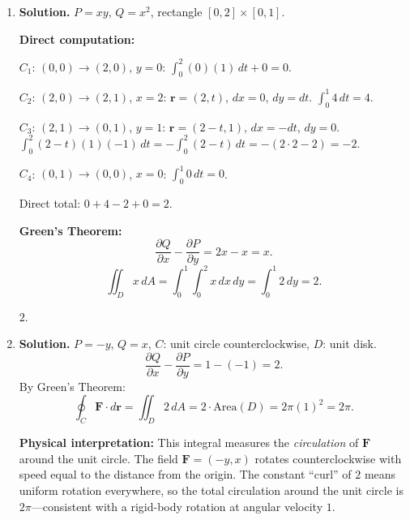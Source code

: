 \begin{enumerate}
\textbf{Conceptual explanation:} The line integral measures the total ``circulation'' of the vector field $(P,Q)$ around the boundary. Green's Theorem says this equals the sum of all the ``local rotation'' ($\partial Q/\partial x - \partial P/\partial y$) accumulated over the interior region. Intuitively, if we partition $D$ into infinitesimally small rectangles and sum the circulation around each, all interior edge contributions cancel (shared edges are traversed in opposite directions by adjacent rectangles), leaving only the outer boundary $C$. The double integral simply adds up the microscopic rotation at every interior point.

\item \textbf{Solution.}
$P = xy$, $Q = x^2$, rectangle $[0,2]\times[0,1]$.

\textbf{Direct computation:}

$C_1$: $(0,0)\to(2,0)$, $y=0$: $\int_0^2 (0)(1)\,dt + 0 = 0$.

$C_2$: $(2,0)\to(2,1)$, $x=2$: $\mathbf{r}=(2,t)$, $dx=0$, $dy=dt$.
$\int_0^1 4\,dt = 4$.

$C_3$: $(2,1)\to(0,1)$, $y=1$: $\mathbf{r}=(2-t,1)$, $dx=-dt$, $dy=0$.
$\int_0^2 (2-t)(1)(-1)\,dt = -\int_0^2(2-t)\,dt = -(2\cdot2-2)=-2$.

$C_4$: $(0,1)\to(0,0)$, $x=0$: $\int_0^1 0\,dt = 0$.

Direct total: $0+4-2+0 = 2$.

\textbf{Green's Theorem:}
\[
\frac{\partial Q}{\partial x} - \frac{\partial P}{\partial y} = 2x - x = x.
\]
\[
\iint_D x\,dA = \int_0^1\int_0^2 x\,dx\,dy = \int_0^1 2\,dy = 2.
\]

$\boxed{2}$.

\item \textbf{Solution.}
$P=-y$, $Q=x$, $C$: unit circle counterclockwise, $D$: unit disk.
\[
\frac{\partial Q}{\partial x}-\frac{\partial P}{\partial y} = 1-(-1)=2.
\]
By Green's Theorem:
\[
\oint_C \mathbf{F}\cdot d\mathbf{r} = \iint_D 2\,dA = 2\cdot\text{Area}(D) = 2\pi(1)^2 = \boxed{2\pi}.
\]

\textbf{Physical interpretation:} This integral measures the \emph{circulation} of $\mathbf{F}$ around the unit circle. The field $\mathbf{F}=(-y,x)$ rotates counterclockwise with speed equal to the distance from the origin. The constant ``curl'' of $2$ means uniform rotation everywhere, so the total circulation around the unit circle is $2\pi$---consistent with a rigid-body rotation at angular velocity $1$.


\end{enumerate}
